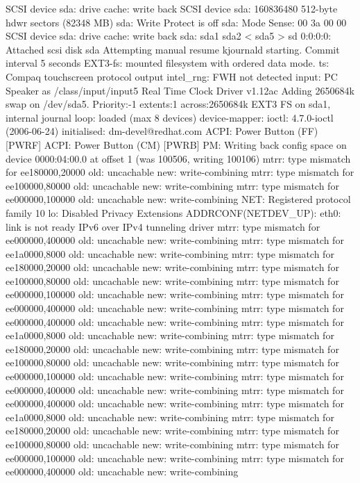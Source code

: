 \documentclass[mingoth,a4paper]{jsarticle}
\begin{document}
{{{{{{{{{{{{{\begin{commandline}
SCSI device sda: drive cache: write back
SCSI device sda: 160836480 512-byte hdwr sectors (82348 MB)
sda: Write Protect is off
sda: Mode Sense: 00 3a 00 00
SCSI device sda: drive cache: write back
 sda: sda1 sda2 < sda5 >
sd 0:0:0:0: Attached scsi disk sda
Attempting manual resume
kjournald starting.  Commit interval 5 seconds
EXT3-fs: mounted filesystem with ordered data mode.
ts: Compaq touchscreen protocol output
intel_rng: FWH not detected
input: PC Speaker as /class/input/input5
Real Time Clock Driver v1.12ac
Adding 2650684k swap on /dev/sda5.  Priority:-1 extents:1 across:2650684k
EXT3 FS on sda1, internal journal
loop: loaded (max 8 devices)
device-mapper: ioctl: 4.7.0-ioctl (2006-06-24) initialised: dm-devel@redhat.com
ACPI: Power Button (FF) [PWRF]
ACPI: Power Button (CM) [PWRB]
PM: Writing back config space on device 0000:04:00.0 at offset 1 (was 100506, writing 100106)
mtrr: type mismatch for ee180000,20000 old: uncachable new: write-combining
mtrr: type mismatch for ee100000,80000 old: uncachable new: write-combining
mtrr: type mismatch for ee000000,100000 old: uncachable new: write-combining
NET: Registered protocol family 10
lo: Disabled Privacy Extensions
ADDRCONF(NETDEV_UP): eth0: link is not ready
IPv6 over IPv4 tunneling driver
mtrr: type mismatch for ee000000,400000 old: uncachable new: write-combining
mtrr: type mismatch for ee1a0000,8000 old: uncachable new: write-combining
mtrr: type mismatch for ee180000,20000 old: uncachable new: write-combining
mtrr: type mismatch for ee100000,80000 old: uncachable new: write-combining
mtrr: type mismatch for ee000000,100000 old: uncachable new: write-combining
mtrr: type mismatch for ee000000,400000 old: uncachable new: write-combining
mtrr: type mismatch for ee000000,400000 old: uncachable new: write-combining
mtrr: type mismatch for ee1a0000,8000 old: uncachable new: write-combining
mtrr: type mismatch for ee180000,20000 old: uncachable new: write-combining
mtrr: type mismatch for ee100000,80000 old: uncachable new: write-combining
mtrr: type mismatch for ee000000,100000 old: uncachable new: write-combining
mtrr: type mismatch for ee000000,400000 old: uncachable new: write-combining
mtrr: type mismatch for ee000000,400000 old: uncachable new: write-combining
mtrr: type mismatch for ee1a0000,8000 old: uncachable new: write-combining
mtrr: type mismatch for ee180000,20000 old: uncachable new: write-combining
mtrr: type mismatch for ee100000,80000 old: uncachable new: write-combining
mtrr: type mismatch for ee000000,100000 old: uncachable new: write-combining
mtrr: type mismatch for ee000000,400000 old: uncachable new: write-combining


\end{commandline}}}}}}}}}}}}}}
\end{document}
